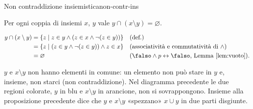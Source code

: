 \begin{concetto}
\begin{Proposizione}{Non contraddizione insiemistica}{non-contr-ins}
    \begin{prerequisiti}
    \end{prerequisiti}
    Per ogni coppia di insiemi $x$, $y$ vale $y \cap (x \setminus y) = \varnothing$.
\end{Proposizione}
\begin{dimostrazione}
    \[
    \begin{aligned}
        y \cap (x \setminus y) &= \{z \mid z \in y \wedge (z \in x \wedge \neg(z \in y))\} && \text{(def.)}\\
        &= \{z \mid (z \in y \wedge \neg(z \in y)) \wedge z \in x\} && \text{(associatività e commutatività di $\wedge$)}\\
        &= \varnothing && \text{($\falso \wedge p \leftrightarrow \falso$, Lemma~\ref{lem:vuoto})}.
    \end{aligned}
    \]
\end{dimostrazione}
\end{concetto}

\begin{spiegazione}
    $y$ e $x \setminus y$ non hanno elementi in comune: un elemento non può stare in $y$ e, insieme, non starci (non contraddizione). Nel diagramma
    precedente le due regioni colorate, $y$ in blu e $x \setminus y$ in arancione, non si sovrappongono. Insieme alla proposizione precedente dice che
    $y$ e $x \setminus y$ «spezzano» $x \cup y$ in due parti disgiunte.
\end{spiegazione}


